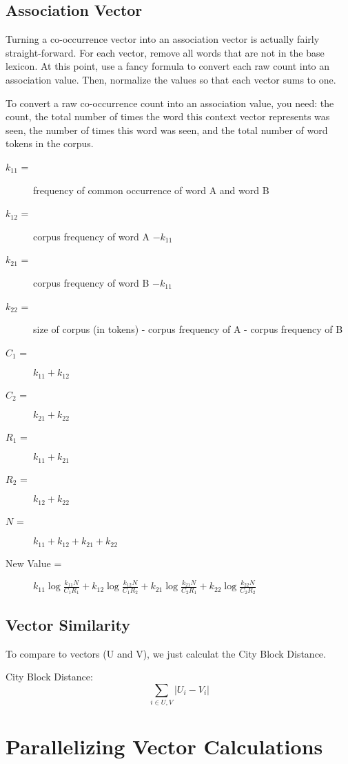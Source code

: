 \documentclass[12pt]{article}
\begin{document}
\subsection{Association Vector}

Turning a co-occurrence vector into an association vector is actually fairly
straight-forward. For each vector, remove all words that are not in the base
lexicon. At this point, use a fancy formula to convert each raw count into an
association value.  Then, normalize the values so that each vector sums to
one.

To convert a raw co-occurrence count into an association value, you need: the
count, the total number of times the word this context vector represents was
seen, the number of times this word was seen, and the total number of word
tokens in the corpus.

\begin{description}
\item[$k_{11}$ =] frequency of common occurrence of word A and word B
\item[$k_{12}$ =] corpus frequency of word A $- k_{11}$
\item[$k_{21}$ =] corpus frequency of word B $- k_{11}$
\item[$k_{22}$ =] size of corpus (in tokens) - corpus frequency of A - corpus frequency of B
\item[$C_1$ =] $k_{11} + k_{12}$
\item[$C_2$ =] $k_{21} + k_{22}$
\item[$R_1$ =] $k_{11} + k_{21}$
\item[$R_2$ =] $k_{12} + k_{22}$
\item[$N$ =] $k_{11} + k_{12} + k_{21} + k_{22}$
\item[New Value = ]
    $k_{11}\log\frac{k_{11}N}{C_1R_1} +
    k_{12}\log\frac{k_{12}N}{C_1R_2} +
    k_{21}\log\frac{k_{21}N}{C_2R_1} +
    k_{22}\log\frac{k_{22}N}{C_2R_2}$
\end{description}


\subsection{Vector Similarity}

To compare to vectors (U and V), we just calculat the City Block Distance.

City Block Distance:
$$\sum_{i\in U,V} |U_i - V_i| $$

\section{Parallelizing Vector Calculations}
\end{document}
